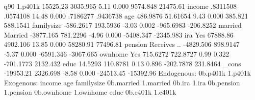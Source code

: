 q90          {\VBAR}
     1.p401k {\VBAR}   15525.23   3035.965     5.11   0.000     9574.848    21475.61
      income {\VBAR}   .8311508   .0574108    14.48   0.000     .7186277    .9436738
         age {\VBAR}   486.9876   51.61654     9.43   0.000      385.821    588.1541
  familysize {\VBAR}  -586.2617   193.5936    -3.03   0.002    -965.6983   -206.8252
             {\VBAR}
     married {\VBAR}
    Married  {\VBAR}  -3877.165   781.2296    -4.96   0.000    -5408.347   -2345.983
             {\VBAR}
         ira {\VBAR}
        Yes  {\VBAR}   67888.86   4902.106    13.85   0.000     58280.91    77496.81
             {\VBAR}
     pension {\VBAR}
Receives ..  {\VBAR}  -4829.506   898.9147    -5.37   0.000    -6591.346   -3067.665
             {\VBAR}
     ownhome {\VBAR}
        Yes  {\VBAR}   715.6272   722.8727     0.99   0.322    -701.1773    2132.432
        educ {\VBAR}    14.5293   110.8781     0.13   0.896    -202.7878    231.8464
       _cons {\VBAR}  -19953.21   2326.698    -8.58   0.000    -24513.45   -15392.96
Endogenous: 0b.p401k 1.p401k
 Exogenous: income age familysize 0b.married 1.married 0b.ira 1.ira
            0b.pension 1.pension 0b.ownhome 1.ownhome educ 0b.e401k 1.e401k
{\smallskip}
